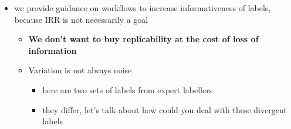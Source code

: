 \documentclass[11pt, twoside]{memoir}
\begin{document}
\begin{itemize}
\begin{itemize}
\begin{itemize}
\begin{itemize}
        \begin{itemize}
        \tightlist
        \item
          as with any annotation system of this sort, it's probably the
          case that novices will be divergent at first, but through
          practice and review of these guidelines, they should converge
          closer together (though should not be expected to end up with
          100\% ---or even a majority of--- identical labels)\\
        \item
          there are some contours where it will be easier to get
          alignment between annotators (e.g., a straight line, vs one
          with lots of slow curves)\\
        \end{itemize}
      \end{itemize}
    \item
      PoLaR is for descriptive observations and NOT
      categorical/phonological analysis. we EXPECT people to make
      different observations for the same data, at different levels of
      granularity (similar to narrow transcription IPA)

      \begin{itemize}
      \tightlist
      \item
        (about labeller intuitions, and how they might truly vary at
        linguistic/cognitive level --- i.e., variation is not always
        noise)\textbf{.}\\
      \end{itemize}
    \end{itemize}
  \item
    we provide guidance on workflows to increase informativeness of
    labels, because IRR is not necessarily a goal

    \begin{itemize}
    \tightlist
    \item
      \textbf{We don't want to buy replicability at the cost of loss of
      information}\\
    \item
      Variation is not always noise

      \begin{itemize}
      \tightlist
      \item
        here are two sets of labels from expert labellers\\
      \item
        they differ, let's talk about how could you deal with these
        divergent labels


\end{itemize}
\end{itemize}
\end{itemize}
\end{itemize}
\end{document}
